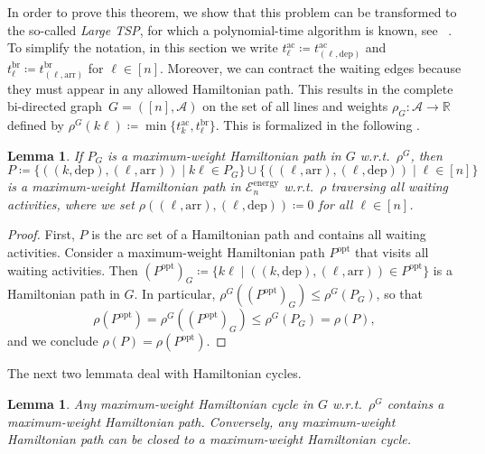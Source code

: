 \documentclass[11pt,a4paper]{article}
\newcommand{\arr}{\mathrm{arr}}
\newcommand{\dep}{\mathrm{dep}}
\newcommand{\energy}{\mathrm{energy}}
\newcommand{\ac}{\mathrm{ac}}
\newcommand{\br}{\mathrm{br}}
\newcommand{\opt}{\mathrm{opt}}
\newcommand{\w}{\rho} %
\newcommand{\R}{\mathbb R}
\newcommand{\cA}{\mathcal{A}}
\newcommand{\cE}{\mathcal{E}}
\newtheorem{lemma}[theorem]{Lemma}
\theoremstyle{definition}
\theoremstyle{remark}
\begin{document}
In order to prove this theorem, we show that this problem can be transformed to the so-called \emph{Large TSP},
for which a polynomial-time algorithm is known, see~\cite{vanDal}%
. To simplify the notation, in this section we write $t_\ell^{\ac} \coloneqq t_{(\ell,\dep)}^{\ac}$ and $t_\ell^{\br} \coloneqq t_{(\ell,\arr)}^{\br}$ for $\ell \in [n]$. 
Moreover, we can contract the waiting edges because they must appear in any allowed Hamiltonian path. This results in the complete bi-directed graph~$G = ([n], \cA)$ on the set of all lines and weights $\w_G \colon \cA \to \R$ defined by $\w^G(k\ell) \coloneqq \min \{t_k^{\ac}, t_\ell^{\br}\}$. This is formalized in the following .

\begin{lemma} \label{lem:equivalence-hamiltonian-cycles}
	If $P_G$ is a maximum-weight Hamiltonian path in $G$ w.r.t.\ $\w^G$, then 
    $$P \coloneqq \{((k,\dep),(\ell,\arr)) \mid k\ell \in P_G\} \cup \{((\ell,\arr),(\ell,\dep)) \mid \ell \in [n]\}$$
    is a maximum-weight Hamiltonian path in $\cE_n^\energy$ w.r.t.\ $\w$ traversing all waiting activities, where we set $\w((\ell, \arr), (\ell, \dep)) \coloneqq 0$ for all $\ell \in [n]$.
\end{lemma}
\begin{proof}
	First, $P$ is the arc set of a Hamiltonian path and contains all waiting activities. Consider a maximum-weight Hamiltonian path $P^{\opt}$ that visits all waiting activities. Then
    $(P^{\opt})_G \coloneqq \{k \ell \mid ((k,\dep),(\ell,\arr)) \in P^{\opt}\}$
    is a Hamiltonian path in $G$. In particular, $\w^G((P^{\opt})_G) \leq \w^G(P_G)$, so that
    $$ \w(P^\opt) = \w^G((P^\opt)_G) 
    \leq \w^G(P_G) 
    = \w(P),$$
    and we conclude $\w(P) = \w(P^\opt)$.
\end{proof}

The next two lemmata deal with Hamiltonian cycles.

\begin{lemma} \label{lem:pathtour}
	Any maximum-weight Hamiltonian cycle in $G$ w.r.t.\ $\w^G$ contains a maximum-weight Hamiltonian path. Conversely, any maximum-weight Hamiltonian path can be closed to a maximum-weight Hamiltonian cycle.
\end{lemma}
\end{document}
